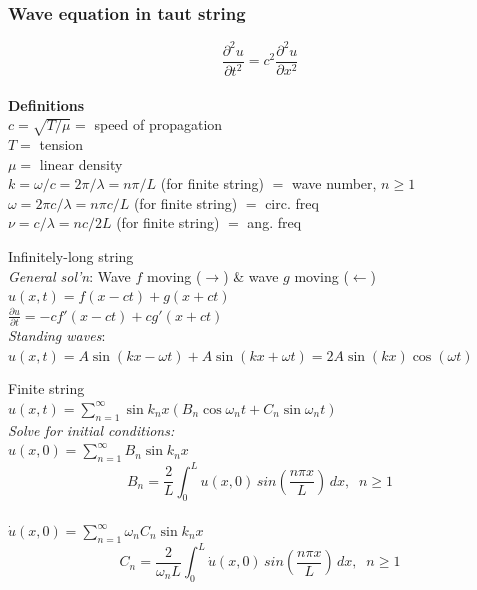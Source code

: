 \documentclass[letterpaper,landscape,10pt]{article}
\newenvironment{mydescription}
{\begin{description}
	\setlength{\itemsep}{0pt}
	\setlength{\parskip}{0pt}
	\setlength{\parsep}{-1pt}}
{\end{description}}
\begin{document}
{\begin{multicols}{4}
	\subsubsection*{Wave equation in taut string}
		\[ \frac{\partial^2u}{\partial t^2} = c^2 \frac{\partial^2u}{\partial x^2} \] \\
		\textbf{Definitions} \\
		\hspace{10pt}$c=\sqrt{T/\mu}=$ speed of propagation \\
		\hspace{10pt}$T=$ tension \\
		\hspace{10pt}$\mu=$ linear density \\
		\hspace{10pt}$k=\omega/c=2\pi/\lambda=n\pi/L$ (for finite string) $=$ wave number, $n\ge 1$ \\
		\hspace{10pt}$\omega=2\pi c/\lambda=n\pi c/L$ (for finite string) $=$ circ. freq \\
		\hspace{10pt}$\nu=c/\lambda=nc/2L$ (for finite string) $=$ ang. freq
		\begin{mydescription}
		  \item[Infinitely-long string] \ \\
			  \textit{General sol'n}: Wave $f$ moving ($\rightarrow$) \& wave $g$ moving ($\leftarrow$) \\
			$u(x,t) = f(x-ct) + g(x+ct)$\\
			$\frac{\partial u}{\partial t} = -cf'(x-ct) + cg'(x+ct)$\\
			  \textit{Standing waves}: $u(x,t)=A\sin(kx-\omega t)+ A\sin(kx+\omega t)=2A\sin(kx)\cos(\omega t)$
		  \item[Finite string] \ \\
			  $u(x,t)=\sum_{n=1}^{\infty} \sin k_nx\left( B_n \cos\omega_n t + C_n \sin \omega_n t \right)$ \\
			  \vspace{5pt}
			  \hspace{-5pt}\textit{Solve for initial conditions:} \\
			  \vspace{2.5pt}
			  $u(x,0)=\sum_{n=1}^{\infty} B_n\sin k_nx$ \\
			  $$B_n = \frac{2}{L}\int_{0}^{L} \! u(x,0)\,sin \left(\frac{n\pi x}{L}\right) \, dx, \;\; n \geq 1$$\\
			  $\dot{u}(x,0)=\sum_{n=1}^{\infty} \omega_n C_n\sin k_nx$ \\
			  $$C_n = \frac{2}{\omega_nL}\int_{0}^{L} \! \dot{u}(x,0)\,sin \left(\frac{n\pi x}{L}\right) \, dx, \;\; n \geq 1$$\\


\end{mydescription}
\end{multicols}}
\end{document}
